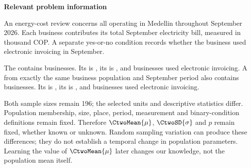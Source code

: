 \secInicio[][sec:p1]

\clearpage



\textbf{Relevant problem information}

\begin{probleminfoexcerpt}
An energy-cost review concerns all     operating in Medellin throughout September 2026. Each business contributes its total September electricity bill, measured in thousand COP. A separate yes-or-no condition records whether the business used electronic invoicing in September.
\end{probleminfoexcerpt}

\begin{probleminfoexcerpt}
The     contains  businesses. Its   is   , its    is   , and  businesses used electronic invoicing. A     from exactly the same business population and September period also contains  businesses. Its   is   , its    is   , and  businesses used electronic invoicing.
\end{probleminfoexcerpt}



Both sample sizes remain 196; the selected units and descriptive statistics differ. Population membership, size, place, period, measurement and binary-condition definitions remain fixed. Therefore $\CtwoMean{\mu}$, $\CtwoSD{\sigma}$ and $p$ remain fixed, whether known or unknown. Random sampling variation can produce these differences; they do not establish a temporal change in population parameters. Learning the value of $\CtwoMean{\mu}$ later changes our knowledge, not the population mean itself.

